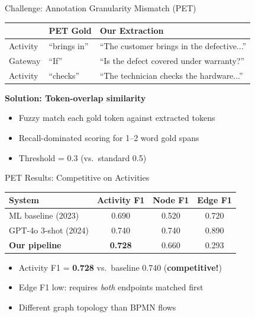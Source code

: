 \documentclass[aspectratio=169, 12pt]{beamer}
\begin{document}
\begin{frame}{Challenge: Annotation Granularity Mismatch (PET)}
\begin{center}
\begin{tabular}{lll}
\toprule
& \textbf{PET Gold} & \textbf{Our Extraction} \\
\midrule
Activity & ``brings in'' & ``The customer brings in the defective...'' \\
Gateway  & ``If'' & ``Is the defect covered under warranty?'' \\
Activity & ``checks'' & ``The technician checks the hardware...'' \\
\bottomrule
\end{tabular}
\end{center}

\vspace{0.5cm}
\textbf{Solution: Token-overlap similarity}
\begin{itemize}
    \item Fuzzy match each gold token against extracted tokens
    \item Recall-dominated scoring for 1--2 word gold spans
    \item Threshold = 0.3 (vs.\ standard 0.5)
\end{itemize}
\end{frame}

\begin{frame}{PET Results: Competitive on Activities}
\centering
\begin{tabular}{lccc}
\toprule
\textbf{System} & \textbf{Activity F1} & \textbf{Node F1} & \textbf{Edge F1} \\
\midrule
ML baseline (2023)  & 0.690 & 0.520 & 0.720 \\
GPT-4o 3-shot (2024) & 0.740 & 0.740 & 0.890 \\
\midrule
\textbf{Our pipeline} & \textbf{0.728} & 0.660 & 0.293 \\
\bottomrule
\end{tabular}

\vspace{0.5cm}
\begin{itemize}
    \item Activity F1 = \textbf{0.728} vs.\ baseline 0.740 \quad (\textbf{competitive!})
    \item Edge F1 low: requires \emph{both} endpoints matched first
    \item Different graph topology than BPMN flows
\end{itemize}
\end{frame}
\end{document}
